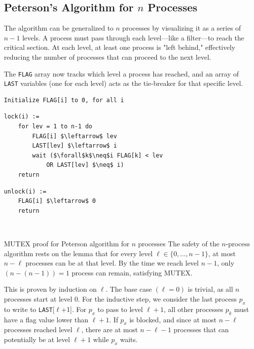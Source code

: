 \subsection{Peterson's Algorithm for $n$ Processes}
The algorithm can be generalized to $n$ processes by visualizing it as a series of $n-1$ levels. A process must pass through each level—like a filter—to reach the critical section. At each level, at least one process is "left behind," effectively reducing the number of processes that can proceed to the next level.

The \texttt{FLAG} array now tracks which level a process has reached, and an array of \texttt{LAST} variables (one for each level) acts as the tie-breaker for that specific level.

\begin{minipage}{\textwidth}
\begin{lstlisting}[mathescape]
Initialize FLAG[i] to 0, for all i
\end{lstlisting}
\begin{minipage}{0.45\textwidth}
\begin{lstlisting}[mathescape]
lock(i) :=
    for lev = 1 to n-1 do
        FLAG[i] $\leftarrow$ lev
        LAST[lev] $\leftarrow$ i
        wait ($\forall$k$\neq$i FLAG[k] < lev
            OR LAST[lev] $\neq$ i)
    return
\end{lstlisting}
\end{minipage}
\hfill
\begin{minipage}{0.45\textwidth}
\begin{lstlisting}[mathescape]
unlock(i) :=
    FLAG[i] $\leftarrow$ 0
    return
\end{lstlisting}
\end{minipage}
\end{minipage}\\

\begin{Lemma}{MUTEX proof for Peterson algorithm for $n$ processes}{}
The safety of the $n$-process algorithm rests on the lemma that for every level $\ell\in\{0,\ldots,n-1\}$, at most $n-\ell$ processes can be at that level. By the time we reach level $n-1$, only $(n-(n-1))=1$ process can remain, satisfying MUTEX.
\begin{demonstration}
This is proven by induction on $\ell$. The base case $(\ell=0)$ is trivial, as all $n$ processes start at level 0. For the inductive step, we consider the last process $p_x$ to write to \texttt{LAST}[$\ell$+1]. For $p_x$ to pass to level $\ell+1$, all other processes $p_k$ must have a flag value lower than $\ell+1$. If $p_x$ is blocked, and since at most $n-\ell$ processes reached level $\ell$, there are at most $n-\ell-1$ processes that can potentially be at level $\ell+1$ while $p_x$ waits.
\end{demonstration}
\end{Lemma}

